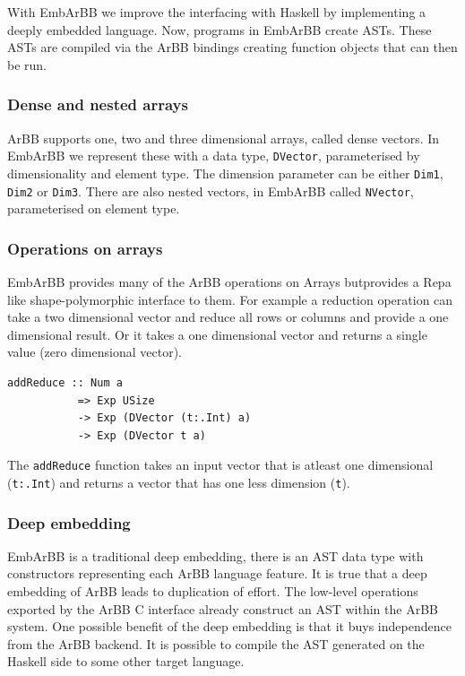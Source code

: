 \documentclass[a4paper]{book}
\begin{document}
With EmbArBB we improve the interfacing with Haskell by implementing a deeply embedded language. 
Now, programs in EmbArBB create ASTs. These ASTs are compiled via the ArBB bindings creating 
function objects that can then be run. 

\subsubsection{Dense and nested arrays}

ArBB supports one, two and three dimensional arrays, called dense vectors. In EmbArBB we 
represent these with a data type, {\tt DVector}, parameterised by dimensionality and 
element type. The dimension parameter can be either {\tt Dim1}, {\tt Dim2} or {\tt Dim3}. 
There are also nested vectors, in EmbArBB called {\tt NVector}, parameterised on element type. 

\subsubsection{Operations on arrays} 

EmbArBB provides many of the ArBB operations on Arrays butprovides a Repa like 
shape-polymorphic interface to them. For example a reduction operation can take a two  
dimensional vector and reduce all rows or columns and provide a one dimensional result. Or 
it takes a one dimensional vector and returns a single value (zero dimensional vector). 

\begin{verbatim} 
addReduce :: Num a 
           => Exp USize 
           -> Exp (DVector (t:.Int) a) 
           -> Exp (DVector t a) 
\end{verbatim} 

The {\tt addReduce} function takes an input vector that is atleast one dimensional 
({\tt t:.Int}) and returns a vector that has one less dimension ({\tt t}).
 
\subsubsection{Deep embedding}

EmbArBB is a traditional deep embedding, there is an AST data type with constructors 
representing each ArBB language feature. It is true that a deep embedding of ArBB 
leads to duplication of effort. The low-level operations exported by the 
ArBB C interface already construct an AST within the ArBB system. One possible benefit 
of the deep embedding is that it buys independence from the ArBB backend. It is possible 
to compile the AST generated on the Haskell side to some other target language. 
\end{document}
